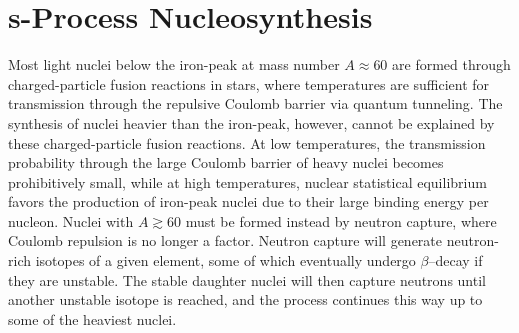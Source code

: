 \section{s-Process Nucleosynthesis} \label{sec:s-process}



Most light nuclei below the iron-peak at mass number $A \approx 60$ are formed through charged-particle fusion reactions in stars, where temperatures are sufficient for transmission through the repulsive Coulomb barrier via quantum tunneling. The synthesis of nuclei heavier than the iron-peak, however, cannot be explained by these charged-particle fusion reactions. At low temperatures, the transmission probability through the large Coulomb barrier of heavy nuclei becomes prohibitively small, while at high temperatures, nuclear statistical equilibrium favors the production of iron-peak nuclei due to their large binding energy per nucleon. Nuclei with $A \gtrsim 60$ must be formed instead by neutron capture, where Coulomb repulsion is no longer a factor. Neutron capture will generate neutron-rich isotopes of a given element, some of which eventually undergo $\beta$--decay if they are unstable. The stable daughter nuclei will then capture neutrons until another unstable isotope is reached, and the process continues this way up to some of the heaviest nuclei.


